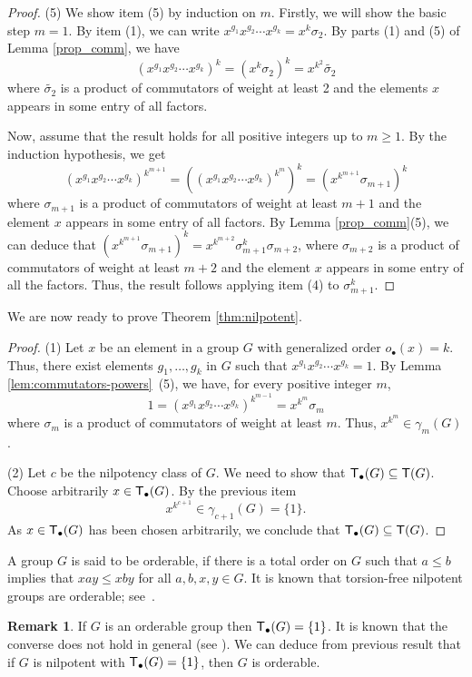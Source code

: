 \documentclass[12pt,leqno]{amsart}
\newcommand{\T}{{\sf T}}
\newcommand{\Tg}{{\sf T_{\bullet}}}
\theoremstyle{definition}
\newtheorem{rem}[theorem]{\sc Remark}
\begin{document}
\begin{proof}
(5)  We show item (5) by induction on $m$. Firstly, we will show the basic step $m=1$. By item (1), we can write 
$x^{g_1}x^{g_2}\cdots x^{g_k}=x^k\sigma_2$. 
By parts (1) and (5) of Lemma \ref{prop_comm}, we have  
$$(x^{g_1}x^{g_2}\cdots x^{g_k})^k=(x^k\sigma_2)^k=x^{k^2}\tilde{\sigma_2}$$
where $\tilde{\sigma_2}$ is a product of commutators of weight at least 2 and the elements $x$ appears in some entry of all factors.

 Now, assume that the result holds for  all positive integers up to $m\geq 1$. By the induction hypothesis, we  get  
$$(x^{g_1}x^{g_2}\cdots x^{g_k})^{k^{m+1}}=((x^{g_1}x^{g_2}\cdots x^{g_k})^{k^{m}})^k=(x^{k^{m+1}}\sigma_{m+1})^k$$ 
%
where $\sigma_{m+1}$ is a product of commutators of weight at least $m+1$ and the element $x$ appears in some entry of all factors. By Lemma \ref{prop_comm}(5), we can deduce that $(x^{k^{m+1}}\sigma_{m+1})^k=x^{k^{m+2}}\sigma_{m+1}^k\sigma_{m+2}$, where $\sigma_{m+2}$ is a product of commutators of weight at least $m+2$ and the element $x$ appears in some entry of all the factors. Thus, the result follows applying item (4) to $\sigma_{m+1}^k$.
\end{proof}

We are now ready to prove Theorem \ref{thm:nilpotent}.

\begin{proof}
(1) Let $x$ be an element in a group $G$ with generalized order $o_{\bullet}(x)=k$. Thus, there exist elements $g_1,\ldots,g_k$ in $G$ such that $x^{g_1}x^{g_2}\cdots x^{g_k}=1$. By Lemma \ref{lem:commutators-powers}~(5), we have, for every positive integer $m$, 
$$1=(x^{g_1}x^{g_2}\cdots x^{g_k})^{k^{m-1}}=x^{k^m}\sigma_m$$
 where $\sigma_{m}$ is a product of commutators of weight at least $m$. Thus, $x^{k^m}\in \gamma_m(G)$.

(2) Let $c$ be the nilpotency class of $G$. We need to show that $\Tg(G) \subseteq \T (G)$. Choose arbitrarily $x \in \Tg(G)$. By the previous item $$x^{k^{c+1}} \in \gamma_{c+1}(G)=\{1\}.$$ As $x \in \Tg(G)$ has been chosen arbitrarily, we conclude that $\Tg(G) \subseteq \T (G)$. 
\end{proof}

A group $G$ is said to be orderable, if there is a total order on $G$ such that $a\leq b$ implies that $xay\leq xby$ for all $a,b,x,y\in G$. 
It is known that torsion-free nilpotent groups are orderable; see~\cite{Bludov}.

\begin{rem}
If $G$ is an orderable group then $\Tg(G)=\{1\}$. It is known that the converse does not hold in general (see \cite{Bludov}). We can deduce from previous result that if $G$ is nilpotent with $\Tg(G)=\{1\}$, then $G$ is orderable.  
\end{rem}
\end{document}
